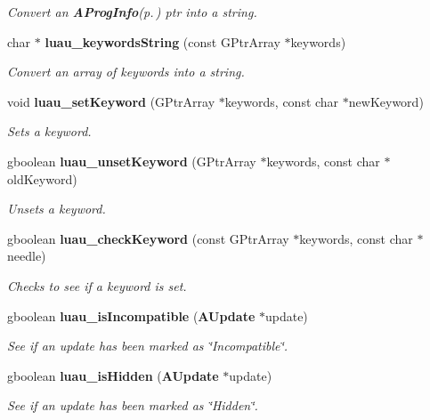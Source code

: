 \begin{CompactItemize}
\begin{CompactList}\small\item\em Convert an {\bf AProg\-Info}{\rm (p.\,\pageref{structAProgInfo})} ptr into a string. \item\end{CompactList}\item 
char $\ast$ {\bf luau\_\-keywords\-String} (const GPtr\-Array $\ast$keywords)
\begin{CompactList}\small\item\em Convert an array of keywords into a string. \item\end{CompactList}\item 
void {\bf luau\_\-set\-Keyword} (GPtr\-Array $\ast$keywords, const char $\ast$new\-Keyword)
\begin{CompactList}\small\item\em Sets a keyword. \item\end{CompactList}\item 
gboolean {\bf luau\_\-unset\-Keyword} (GPtr\-Array $\ast$keywords, const char $\ast$old\-Keyword)
\begin{CompactList}\small\item\em Unsets a keyword. \item\end{CompactList}\item 
gboolean {\bf luau\_\-check\-Keyword} (const GPtr\-Array $\ast$keywords, const char $\ast$needle)
\begin{CompactList}\small\item\em Checks to see if a keyword is set. \item\end{CompactList}\item 
gboolean {\bf luau\_\-is\-Incompatible} ({\bf AUpdate} $\ast$update)
\begin{CompactList}\small\item\em See if an update has been marked as \char`\"{}Incompatible\char`\"{}. \item\end{CompactList}\item 
gboolean {\bf luau\_\-is\-Hidden} ({\bf AUpdate} $\ast$update)
\begin{CompactList}\small\item\em See if an update has been marked as \char`\"{}Hidden\char`\"{}. \item\end{CompactList}\item 

\end{CompactItemize}
